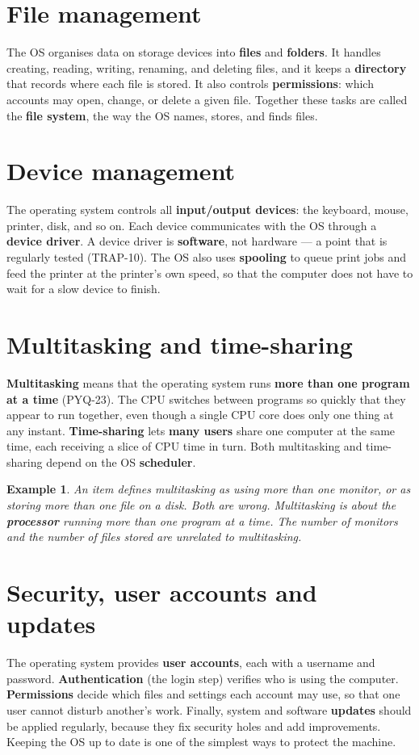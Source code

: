 \documentclass[11pt]{article}
\newtheorem{example}{Example}[section]
\begin{document}
\section{File management}
The OS organises data on storage devices into \textbf{files} and
\textbf{folders}. It handles creating, reading, writing, renaming, and deleting
files, and it keeps a \textbf{directory} that records where each file is
stored. It also controls \textbf{permissions}: which accounts may open, change,
or delete a given file. Together these tasks are called the \textbf{file
system}, the way the OS names, stores, and finds files.

\section{Device management}
The operating system controls all \textbf{input/output devices}: the keyboard,
mouse, printer, disk, and so on. Each device communicates with the OS through a
\textbf{device driver}. A device driver is \textbf{software}, not hardware ---
a point that is regularly tested (TRAP-10). The OS also uses \textbf{spooling}
to queue print jobs and feed the printer at the printer's own speed, so that
the computer does not have to wait for a slow device to finish.

\section{Multitasking and time-sharing}
\textbf{Multitasking} means that the operating system runs \textbf{more than
one program at a time} (PYQ-23). The CPU switches between programs so quickly
that they appear to run together, even though a single CPU core does only one
thing at any instant. \textbf{Time-sharing} lets \textbf{many users} share one
computer at the same time, each receiving a slice of CPU time in turn. Both
multitasking and time-sharing depend on the OS \textbf{scheduler}.

\begin{example}
An item defines multitasking as using more than one monitor, or as storing more
than one file on a disk. Both are wrong. Multitasking is about the
\textbf{processor} running more than one program at a time. The number of
monitors and the number of files stored are unrelated to multitasking.
\end{example}

\section{Security, user accounts and updates}
The operating system provides \textbf{user accounts}, each with a username and
password. \textbf{Authentication} (the login step) verifies who is using the
computer. \textbf{Permissions} decide which files and settings each account may
use, so that one user cannot disturb another's work. Finally, system and
software \textbf{updates} should be applied regularly, because they fix
security holes and add improvements. Keeping the OS up to date is one of the
simplest ways to protect the machine.
\end{document}
